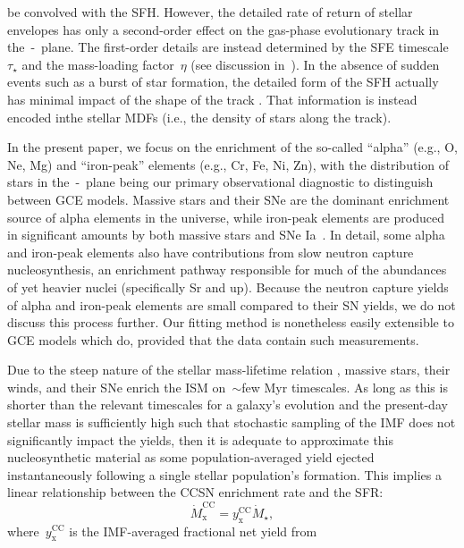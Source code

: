 \documentclass[ms.tex]{subfiles}
\begin{document}
be convolved with the SFH.
However, the detailed rate of return of stellar envelopes has only a
second-order effect on the gas-phase evolutionary track in the~\afe-\feh~plane.
The first-order details are instead determined by the SFE timescale~$\tau_\star$
and the mass-loading factor~$\eta$ (see discussion in~\citealt{Weinberg2017}).
In the absence of sudden events such as a burst of star formation, the detailed
form of the SFH actually has minimal impact of the shape of the track
\citep{Weinberg2017, Johnson2020}.
That information is instead encoded inthe stellar MDFs (i.e., the density of
stars along the track).
\par
In the present paper, we focus on the enrichment of the so-called ``alpha''
(e.g., O, Ne, Mg) and ``iron-peak'' elements (e.g., Cr, Fe, Ni, Zn), with the
distribution of stars in the~\afe-\feh~plane being our primary observational
diagnostic to distinguish between GCE models.
Massive stars and their SNe are the dominant enrichment source of alpha
elements in the universe, while iron-peak elements are produced in significant
amounts by both massive stars and SNe Ia~\citep[e.g.,][]{Johnson2019}.
In detail, some alpha and iron-peak elements also have contributions from slow
neutron capture nucleosynthesis, an enrichment pathway responsible for much of
the abundances of yet heavier nuclei (specifically Sr and up).
Because the neutron capture yields of alpha and iron-peak elements are
small compared to their SN yields, we do not discuss this process further.
Our fitting method is nonetheless easily extensible to GCE models which do,
provided that the data contain such measurements.
\par
Due to the steep nature of the stellar mass-lifetime relation
\citep[e.g.,][]{Larson1974, Maeder1989, Hurley2000}, massive stars, their winds,
and their SNe enrich the ISM on~$\sim$few Myr timescales.
As long as this is shorter than the relevant timescales for a galaxy's
evolution and the present-day stellar mass is sufficiently high such that
stochastic sampling of the IMF does not significantly impact the yields, then
it is adequate to approximate this nucleosynthetic material as some
population-averaged yield ejected instantaneously following a single stellar
population's formation.
This implies a linear relationship between the CCSN enrichment rate and the
SFR:
\begin{equation}
\dot{M}_\text{x}^\text{CC} = y_\text{x}^\text{CC} \dot{M}_\star,
\end{equation}
where~$y_\text{x}^\text{CC}$ is the IMF-averaged fractional net yield from
\end{document}
